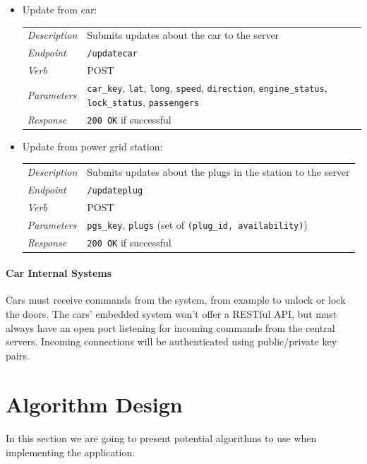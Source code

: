 \documentclass[english]{article}
\newcommand{\code}[1]{\texttt{#1}}
\begin{document}
\begin{itemize}
	\item{Update from car:}\\
	\begin{tabular}{ | l l }
		\textit{Description} & Submits updates about the car to the server\\
		\textit{Endpoint} & \code{/updatecar} \\ 
		\textit{Verb} & POST \\  
		\textit{Parameters} & \code{car\_key}, \code{lat}, \code{long}, \code{speed}, \code{direction}, \code{engine\_status}, \code{lock\_status}, \code{passengers}\\
		\textit{Response} & \code{200 OK} if successful
	\end{tabular}
	
	\item{Update from power grid station:}\\
	\begin{tabular}{ | l l }
		\textit{Description} & Submits updates about the plugs in the station to the server\\
		\textit{Endpoint} & \code{/updateplug} \\ 
		\textit{Verb} & POST \\  
		\textit{Parameters} & \code{pgs\_key}, \code{plugs} (set of \code{(plug\_id, availability)})\\
		\textit{Response} & \code{200 OK} if successful
	\end{tabular}

\end{itemize}

\paragraph{Car Internal Systems}
Cars must receive commands from the system, from example to unlock or lock the doors. 
The cars' embedded system won't offer a RESTful API, but must always have an open port listening for incoming commands from the central servers. Incoming connections will be authenticated using public/private key pairs.

\newpage

\section{Algorithm Design}

\paragraph{}
In this section we are going to present potential algorithms to use when implementing the application.
\end{document}
